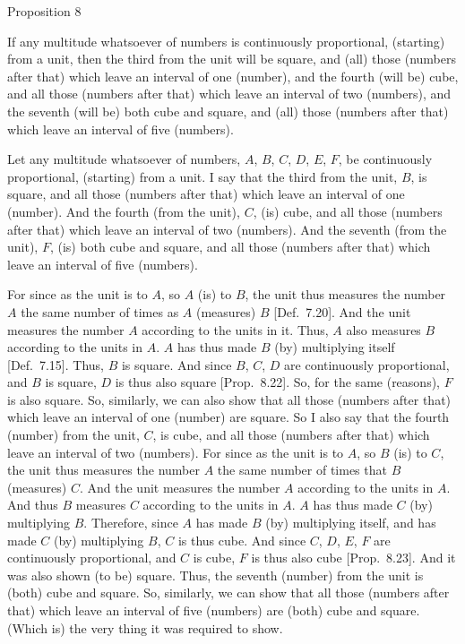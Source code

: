 
\begin{center}
{\large Proposition 8}
\end{center}

If any multitude whatsoever of numbers is continuously proportional, (starting) from a unit, then the third from the unit will be 
square, and (all) those (numbers after that) which leave an interval of  one (number), and the fourth (will
be) cube, and all those (numbers after that) which leave an interval of two (numbers), and the seventh
(will be) both cube and square, and (all) those (numbers after that) which leave an interval of five (numbers).

\epsfysize=1.8in
\centerline{}

Let any multitude whatsoever of numbers, $A$, $B$, $C$, $D$, $E$, $F$, be continuously proportional, (starting) from a unit. I say that the third from the unit, $B$, is square, and all those (numbers after that) which leave an interval of one (number). And the fourth (from the unit), $C$,
(is)  cube, and all those (numbers after that) which leave an
interval of two (numbers). And the seventh (from the unit), $F$, (is)
both cube and square,  and all those (numbers after that) which leave an interval of five (numbers).

For since as the unit is to $A$, so $A$ (is) to $B$, the unit thus measures the number $A$
the same number of times as $A$ (measures) $B$ [Def.~7.20]. And the unit measures the number $A$
according to the units in it. Thus, $A$ also measures $B$ according to the units
in $A$. $A$ has thus made $B$ (by) multiplying itself [Def.~7.15].  Thus, $B$ is  square. And
since $B$, $C$, $D$ are continuously proportional, and $B$ is  square, $D$ is thus also  square  
[Prop.~8.22]. So, for the same (reasons), $F$ is also
 square. So, similarly, we can also show that all those (numbers after that) which leave an interval of  one (number) are square. 
So I also say that the fourth (number) from the unit, $C$,  is  cube, and
all those (numbers after that) which leave an interval of two (numbers).
For since as the unit is to $A$, so $B$ (is) to $C$, the unit thus measures the
number $A$ the same number of times that $B$ (measures) $C$. And the
unit measures the number $A$ according to the units in $A$. And thus
$B$ measures $C$ according to the units in $A$.  $A$ has thus made $C$
(by) multiplying $B$. Therefore, since $A$ has made $B$ (by) multiplying
itself, and has made $C$ (by) multiplying $B$, $C$ is thus  cube. And since $C$, $D$, $E$, $F$ are continuously proportional, and
$C$ is cube, $F$ is thus also  cube  [Prop.~8.23]. And it was also shown (to be) 
square. Thus, the seventh (number) from the unit is (both) 
cube and  square. So, similarly, we can show that  all those (numbers after that) which leave an interval of five (numbers) are (both)
cube and square. (Which is) the very thing it was required to show.

